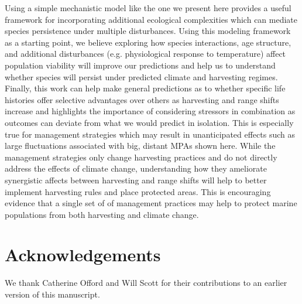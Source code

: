 \documentclass[12pt,english]{article}
\begin{document}
\begin{spacing}{1.9}
\begin{flushleft}
Using a simple mechanistic model like the one we present here provides a useful framework for incorporating additional ecological complexities which can mediate species persistence under multiple disturbances. Using this modeling framework as a starting point, we believe exploring how species interactions, age structure, and additional disturbances (e.g. physiological response to temperature) affect population viability will improve our predictions and help us to understand whether species will persist under predicted climate and harvesting regimes. Finally, this work can help make general predictions as to whether specific life histories offer selective advantages over others as harvesting and range shifts increase and highlights the importance of considering stressors in combination as outcomes can deviate from what we would predict in isolation. This is especially true for management strategies which may result in unanticipated effects such as large fluctuations associated with big, distant MPAs shown here. While the management strategies only change harvesting practices and do not directly address the effects of climate change, understanding how they ameliorate synergistic affects between harvesting and range shifts will help to better implement harvesting rules and place protected areas.  This is encouraging evidence that a single set of of management practices may help to protect marine populations from both harvesting and climate change.

\section*{ Acknowledgements}
We thank Catherine Offord and Will Scott for their contributions to an earlier version of this manuscript. 

\end{flushleft}



\pagebreak


\end{spacing}
\end{document}
